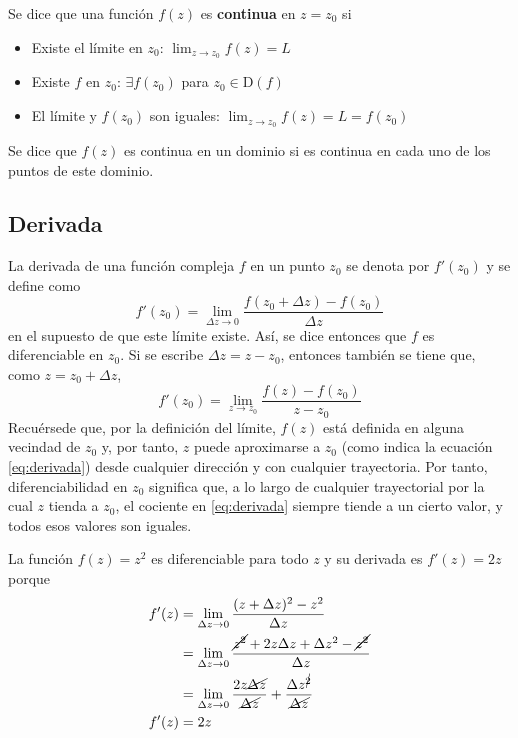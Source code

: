 Se dice que una función $f(z)$ es \textbf{continua} en $z=z_0$ si
\begin{itemize}
  \item Existe el límite en $z_0$: $\lim_{z\to z_0} f(z) = L$
  \item Existe $f$ en $z_0$: $\exists f(z_0) $ para $z_0 \in\text{D}(f)$
  \item El límite y $f(z_0)$ son iguales: $\lim_{z\to z_0} f(z) = L = f(z_0)$
\end{itemize}

Se dice que $f(z)$ es continua en un dominio si es continua en cada uno de los puntos de este dominio.

\subsection{Derivada}

La derivada de una función compleja $f$ en un punto $z_0$ se denota por $f'(z_0)$ y se define como
\begin{equation}
  \boxed{f'(z_0)=\lim_{\Delta z \to 0}\frac{f(z_0+\Delta z)-f(z_0)}{\Delta z}}
\end{equation}
en el supuesto de que este límite existe. Así, se dice entonces que $f$ es diferenciable en $z_0$. Si se escribe $\Delta z = z-z_0$, entonces también se tiene que, como $z=z_0+\Delta z$,
\begin{equation}
  f'(z_0) = \lim_{z\to z_0} \frac{f(z)-f(z_0)}{z-z_0}
  \label{eq:derivada}
\end{equation}
Recuérsede que, por la definición del límite, $f(z)$ está definida en alguna vecindad de $z_0$ y, por tanto, $z$ puede aproximarse a $z_0$ (como indica la ecuación \ref{eq:derivada}) desde cualquier dirección y con cualquier trayectoria. Por tanto, diferenciabilidad en $z_0$ significa que, a lo largo de cualquier trayectorial por la cual $z$ tienda a $z_0$, el cociente en \ref{eq:derivada} siempre tiende a un cierto valor, y todos esos valores son iguales. 
\begin{example}
  La función $f(z)=z^2$ es diferenciable para todo $z$ y su derivada es $f'(z)=2z$ porque
  \begin{align*}
    f'(z)&=\lim_{\Delta z \to 0} \frac{(z+\Delta z)^2-z^2}{\Delta z} \\
         &=\lim_{\Delta z \to 0} \frac{\cancel{z^2}+2z\Delta z + \Delta z^2 - \cancel{z^2}}{\Delta z} \\ 
         &=\lim_{\Delta z \to 0} \frac{2z\cancel{\Delta z}}{\cancel{\Delta z}} + \frac{\Delta z^{\cancel{2}}}{\cancel{\Delta z}} \\ 
    f'(z)&=2z
  \end{align*}
  \label{ej:derivada}
\end{example}

